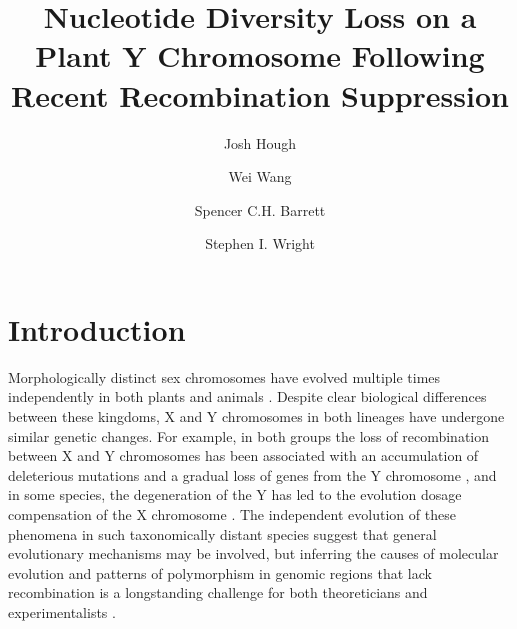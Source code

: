 \documentclass[9pt,twocolumn,twoside]{gsajnl}
\title{Nucleotide Diversity Loss on a Plant Y Chromosome Following Recent Recombination Suppression}
\author[$\ast$,$\dagger$,1]{Josh Hough}
\author[$\dagger$]{Wei Wang}
\author[$\dagger$]{Spencer C.H. Barrett}
\author[$\dagger$]{Stephen I. Wright}
\affil[$\ast$]{Department of Plant Sciences, University of California, Davis}
\affil[$\dagger$]{Department of Ecology and Evolutionary Biology, University of Toronto}
\begin{document}
\maketitle
\thispagestyle{firststyle}
\marginmark
\firstpagefootnote
{}
\vspace{-11pt}

\section*{Introduction}

\lettrine[lines=2]{\color{color2}M}{}orphologically distinct sex chromosomes have evolved multiple times independently in both plants and animals \citep{westergaard1958,ohno1967,bull1983,charlesworth1991,charlesworth2015plant}. Despite clear biological differences between these kingdoms, X and Y chromosomes in both lineages have undergone similar genetic changes. For example, in both groups the loss of recombination between X and Y chromosomes has been associated with an accumulation of deleterious mutations and a gradual loss of genes from the Y chromosome \citep{hough2014,bergero2015,bachtrog2013NRG}, and in some species, the degeneration of the Y has led to the evolution dosage compensation of the X chromosome \citep{charlesworth1996CB,muyle2012,mank2013sex,papadopulos2015}. The independent evolution of these phenomena in such taxonomically distant species suggest that general evolutionary mechanisms may be involved, but inferring the causes of molecular evolution and patterns of polymorphism in genomic regions that lack recombination is a longstanding challenge for both theoreticians and experimentalists \citep{charlesworth1978,feldman1980evolution,barton1995general,charlesworth1996CB,otto1997deleterious,charlesworth2000degeneration,mcvean2000effects}.
\end{document}
